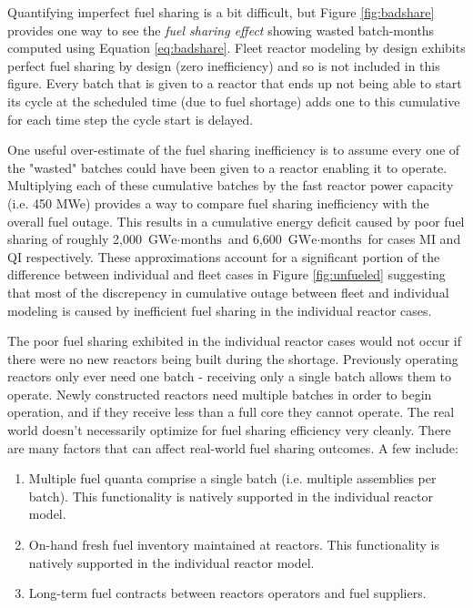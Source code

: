 \documentclass{style}
\begin{document}
Quantifying imperfect fuel sharing is a bit difficult, but Figure
\ref{fig:badshare} provides one way to see the \emph{fuel sharing effect}
showing wasted batch-months computed using Equation \ref{eq:badshare}.  Fleet
reactor modeling by design exhibits perfect fuel sharing by design (zero
inefficiency) and so is not included in this figure.  Every batch that is
given to a reactor that ends up not being able to start its cycle at the
scheduled time (due to fuel shortage) adds one to this cumulative for each
time step the cycle start is delayed.

One useful over-estimate of the fuel sharing inefficiency is to assume every
one of the "wasted" batches could have been given to a reactor enabling it to
operate.  Multiplying each of these cumulative batches by the fast reactor power capacity
(i.e. 450 MWe) provides a way to compare fuel sharing inefficiency with the
overall fuel outage.  This results in a cumulative energy deficit caused by
poor fuel sharing of roughly 2,000 $\text{GWe} \cdot \text{months}$ and 6,600
$\text{GWe} \cdot \text{months}$ for cases MI and QI respectively.  These
approximations account for a significant portion of the difference between individual
and fleet cases in Figure \ref{fig:unfueled} suggesting that most of the
discrepency in cumulative outage between fleet and individual modeling is
caused by inefficient fuel sharing in the individual reactor cases.

The poor fuel sharing exhibited in the individual reactor cases would not
occur if there were no new reactors being built during the shortage.
Previously operating reactors only ever need one batch - receiving only a
single batch allows them to operate.  Newly constructed reactors need multiple
batches in order to begin operation, and if they receive less than a full core
they cannot operate.  The real world doesn't necessarily optimize for fuel
sharing efficiency very cleanly. There are many factors that can affect
real-world fuel sharing outcomes.  A few include:

\begin{enumerate}

    \item Multiple fuel quanta comprise a single batch (i.e. multiple
        assemblies per batch). This functionality is natively supported in the
        individual reactor model.

    \item On-hand fresh fuel inventory maintained at reactors. This
        functionality is natively supported in the individual reactor model.

    \item Long-term fuel contracts between reactors operators and fuel
        suppliers.

\end{enumerate}
\end{document}

